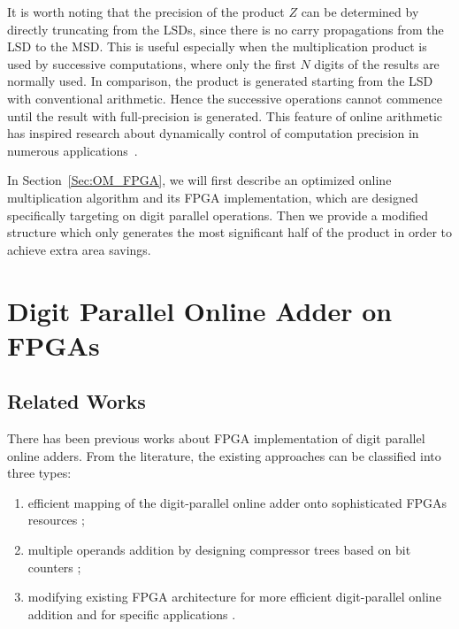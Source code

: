 \documentclass[conference]{IEEEtran}
\begin{document}
It is worth noting that the precision of the product $Z$ can be determined by directly truncating from the LSDs, since there is no carry propagations from the LSD to the MSD. This is useful especially when the multiplication product is used by successive computations, where only the first $N$ digits of the results are normally used. In comparison, the product is generated starting from the LSD with conventional arithmetic. Hence the successive operations cannot commence until the result with full-precision is generated. This feature of online arithmetic has inspired research about dynamically control of computation precision in numerous applications~\cite{Online_Truncation}.


In Section~\ref{Sec:OM_FPGA}, we will first describe an optimized online multiplication algorithm and its FPGA implementation, which are designed specifically targeting on digit parallel operations. Then we provide a modified structure which only generates the most significant half of the product in order to achieve extra area savings.



\section{Digit Parallel Online Adder on FPGAs}\label{Sec:OA_FPGA}
\subsection{Related Works}
There has been previous works about FPGA implementation of digit parallel online adders. From the literature, the existing approaches can be classified into three types:

\begin{enumerate}
    \item efficient mapping of the digit-parallel online adder onto sophisticated FPGAs resources \cite{FPT09RA,ASAP09RA};
    \item multiple operands addition by designing compressor trees based on bit counters \cite{TC13RA,CSMult_CounterArray};
    \item modifying existing FPGA architecture for more efficient digit-parallel online addition \cite{DAC07_CounterTree} and for specific applications \cite{FPL09_onlineCCM}.
\end{enumerate}
\end{document}
